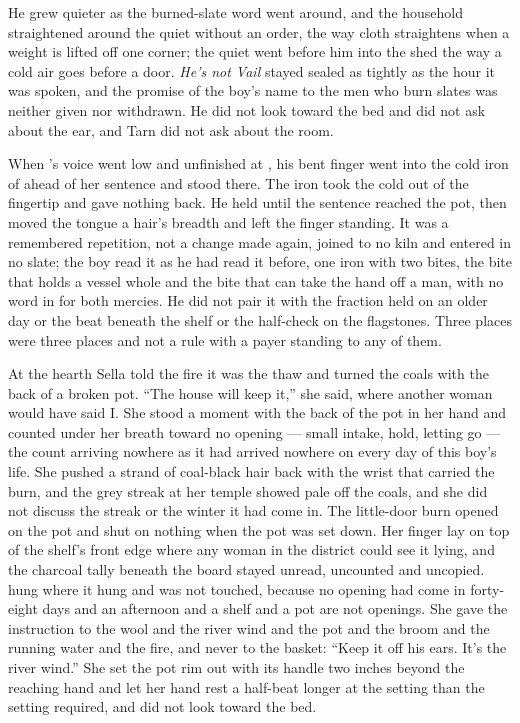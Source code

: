 He grew quieter as the burned-slate word went around, and the household straightened around the quiet without an order, the way cloth straightens when a weight is lifted off one corner; the quiet went before him into the shed the way a cold air goes before a door. \emph{He's not Vail} stayed sealed as tightly as the hour it was spoken, and the promise of the boy's name to the men who burn slates was neither given nor withdrawn. He did not look toward the bed and did not ask about the ear, and Tarn did not ask about the room.

When 's voice went low and unfinished at , his bent finger went into the cold iron of  ahead of her sentence and stood there. The iron took the cold out of the fingertip and gave nothing back. He held until the sentence reached the pot, then moved the tongue a hair's breadth and left the finger standing. It was a remembered repetition, not a change made again, joined to no kiln and entered in no slate; the boy read it as he had read it before, one iron with two bites, the bite that holds a vessel whole and the bite that can take the hand off a man, with no word in  for both mercies. He did not pair it with the fraction held on an older day or the beat beneath the shelf or the half-check on the flagstones. Three places were three places and not a rule with a payer standing to any of them.

\scenebreak

At the hearth Sella told the fire it was the thaw and turned the coals with the back of a broken pot. “The house will keep it,” she said, where another woman would have said I. She stood a moment with the back of the pot in her hand and counted under her breath toward no opening --- small intake, hold, letting go --- the count arriving nowhere as it had arrived nowhere on every day of this boy's life. She pushed a strand of coal-black hair back with the wrist that carried the burn, and the grey streak at her temple showed pale off the coals, and she did not discuss the streak or the winter it had come in. The little-door burn opened on the pot and shut on nothing when the pot was set down. Her finger lay on top of the shelf's front edge where any woman in the district could see it lying, and the charcoal tally beneath the board stayed unread, uncounted and uncopied.  hung where it hung and was not touched, because no opening had come in forty-eight days and an afternoon and a shelf and a pot are not openings. She gave the instruction to the wool and the river wind and the pot and the broom and the running water and the fire, and never to the basket: “Keep it off his ears. It's the river wind.” She set the pot rim out with its handle two inches beyond the reaching hand and let her hand rest a half-beat longer at the setting than the setting required, and did not look toward the bed.

